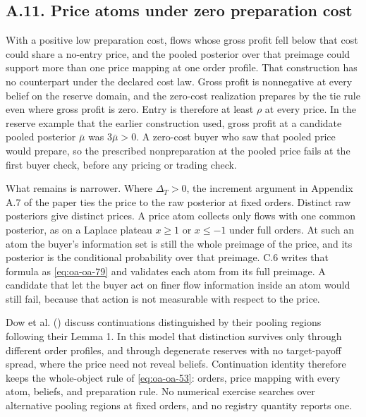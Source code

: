 \subsection{A.11. Price atoms under zero preparation
cost}\label{oa-a-pools}

With a positive low preparation cost, flows whose gross profit fell below that
cost could share a no-entry price, and the pooled posterior over that preimage
could support more than one price mapping at one order profile.
That construction has no counterpart under the declared cost law.
Gross profit is nonnegative at every belief on the reserve domain, and the
zero-cost realization prepares by the tie rule even where gross profit is zero.
Entry is therefore at least \(\rho\) at every price. In the reserve example
that the earlier construction used, gross profit at a candidate pooled
posterior \(\bar\mu\) was \(3\bar\mu>0\). A zero-cost buyer who saw that pooled
price would prepare, so the prescribed nonpreparation at the pooled price
fails at the first buyer check, before any pricing or trading check.

What remains is narrower. Where \(\Delta_T>0\), the increment argument in
Appendix A.7 of the paper ties the price to the raw posterior at fixed orders.
Distinct raw posteriors give distinct prices.
A price atom collects only flows with one common posterior, as on a Laplace
plateau \(x\ge1\) or \(x\le-1\) under full orders.
At such an atom the buyer's information set is still the whole preimage of the
price, and its posterior is the conditional probability over that preimage.
C.6 writes that formula as \eqref{eq:oa-oa-79} and validates each atom from its
full preimage. A candidate that let the buyer act on finer flow information
inside an atom would still fail, because that action is not measurable with
respect to the price.

Dow et al. () discuss continuations
distinguished by their pooling regions following their Lemma 1.
In this model that distinction survives only through different order profiles,
and through degenerate reserves with no target-payoff spread, where the price
need not reveal beliefs. Continuation identity therefore keeps the whole-object
rule of \eqref{eq:oa-oa-53}: orders, price mapping with every atom, beliefs,
and preparation rule. No numerical exercise searches over alternative pooling
regions at fixed orders, and no registry quantity reports one.
